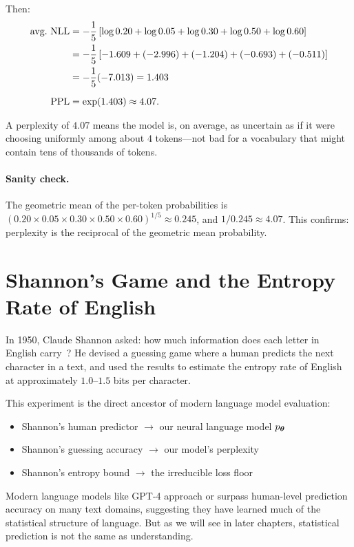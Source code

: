 Then:
\begin{align}
\text{avg.\ NLL} &= -\frac{1}{5}\left[\log 0.20 + \log 0.05 + \log 0.30 + \log 0.50 + \log 0.60\right] \\
&= -\frac{1}{5}\left[-1.609 + (-2.996) + (-1.204) + (-0.693) + (-0.511)\right] \\
&= -\frac{1}{5}(-7.013) = 1.403 \\[6pt]
\operatorname{PPL} &= \exp(1.403) \approx 4.07.
\end{align}

A perplexity of $4.07$ means the model is, on average, as uncertain as if it were choosing uniformly among about $4$ tokens---not bad for a vocabulary that might contain tens of thousands of tokens.

\paragraph{Sanity check.} The geometric mean of the per-token probabilities is $(0.20 \times 0.05 \times 0.30 \times 0.50 \times 0.60)^{1/5} \approx 0.245$, and $1/0.245 \approx 4.07$. This confirms: perplexity is the reciprocal of the geometric mean probability.


\section{Shannon's Game and the Entropy Rate of English}
\label{ch:01:sec:shannon}

In 1950, Claude Shannon asked: how much information does each letter in English carry~\parencite{shannon1950}? He devised a guessing game where a human predicts the next character in a text, and used the results to estimate the entropy rate of English at approximately $1.0$--$1.5$ bits per character.

This experiment is the direct ancestor of modern language model evaluation:
\begin{itemize}
  \item Shannon's human predictor $\longrightarrow$ our neural language model $p_{\boldsymbol{\theta}}$
  \item Shannon's guessing accuracy $\longrightarrow$ our model's perplexity
  \item Shannon's entropy bound $\longrightarrow$ the irreducible loss floor
\end{itemize}

Modern language models like GPT-4 approach or surpass human-level prediction accuracy on many text domains, suggesting they have learned much of the statistical structure of language. But as we will see in later chapters, statistical prediction is not the same as understanding.


